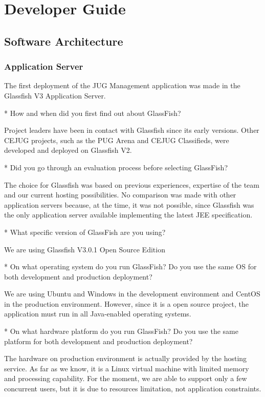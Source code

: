 \documentclass[10pt,a4paper]{report}
\begin{document}
\part{Developer Guide}
\chapter{Software Architecture}

\section{Application Server}
The first deployment of the JUG Management application was made in the Glassfish V3 Application Server. 

* How and when did you first find out about GlassFish?

Project leaders have been in contact with Glassfish since its early versions. Other CEJUG projects, such as the PUG Arena and CEJUG Classifieds, were developed and deployed on Glassfish V2.

* Did you go through an evaluation process before selecting GlassFish?

The choice for Glassfish was based on previous experiences, expertise of the team and our current hosting possibilities. No comparison was made with other application servers because, at the time, it was not possible, since Glassfish was the only application server available implementing the latest JEE specification.

* What specific version of GlassFish are you using?

We are using Glassfish V3.0.1 Open Source Edition

* On what operating system do you run GlassFish?  Do you use the same OS for
  both development and production deployment?
  
We are using Ubuntu and Windows in the development environment and CentOS in the production environment. However, since it is a open source project, the application must run in all Java-enabled operating systems.

* On what hardware platform do you run GlassFish?  Do you use the same platform
  for both development and production deployment?
  
  The hardware on production environment is actually provided by the hosting service. As far as we know, it is a Linux virtual machine with limited memory and processing capability. For the moment, we are able to support only a few concurrent users, but it is due to resources limitation, not application constraints.
\end{document}
